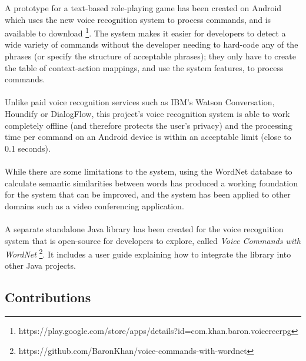 \documentclass[11pt]{article}
\begin{document}
A prototype for a text-based role-playing game has been created on Android which uses the new voice recognition system to process commands, and is available to download \footnote{https://play.google.com/store/apps/details?id=com.khan.baron.voicerecrpg}. The system makes it easier for developers to detect a wide variety of commands without the developer needing to hard-code any of the phrases (or specify the structure of acceptable phrases); they only have to create the table of context-action mappings, and use the system features, to process commands.
\\
\\
Unlike paid voice recognition services such as IBM's Watson Conversation, Houndify or DialogFlow, this project's voice recognition system is able to work completely offline (and therefore protects the user's privacy) and the processing time per command on an Android device is within an acceptable limit (close to 0.1 seconds).
\\
\\
While there are some limitations to the system, using the WordNet database to calculate semantic similarities between words has produced a working foundation for the system that can be improved, and the system has been applied to other domains such as a video conferencing application.
\\
\\
A separate standalone Java library has been created for the voice recognition system that is open-source for developers to explore, called \textit{Voice Commands with WordNet} \footnote{https://github.com/BaronKhan/voice-commands-with-wordnet}. It includes a user guide explaining how to integrate the library into other Java projects.

\subsection{Contributions}
\label{section:contributions}
\end{document}
